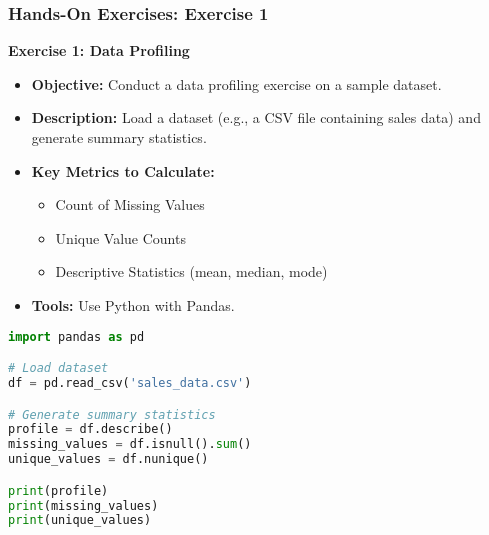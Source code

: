 \documentclass[aspectratio=169]{beamer}
\begin{document}
\begin{frame}[fragile]
    \frametitle{Hands-On Exercises: Exercise 1}
    \textbf{Exercise 1: Data Profiling}
    \begin{itemize}
        \item \textbf{Objective:} Conduct a data profiling exercise on a sample dataset.
        \item \textbf{Description:} Load a dataset (e.g., a CSV file containing sales data) and generate summary statistics.
        \item \textbf{Key Metrics to Calculate:}
            \begin{itemize}
                \item Count of Missing Values
                \item Unique Value Counts
                \item Descriptive Statistics (mean, median, mode)
            \end{itemize}
        \item \textbf{Tools:} Use Python with Pandas.
    \end{itemize}
    \begin{lstlisting}[language=Python]
import pandas as pd

# Load dataset
df = pd.read_csv('sales_data.csv')

# Generate summary statistics
profile = df.describe()
missing_values = df.isnull().sum()
unique_values = df.nunique()

print(profile)
print(missing_values)
print(unique_values)
    \end{lstlisting}
\end{frame}
\end{document}

